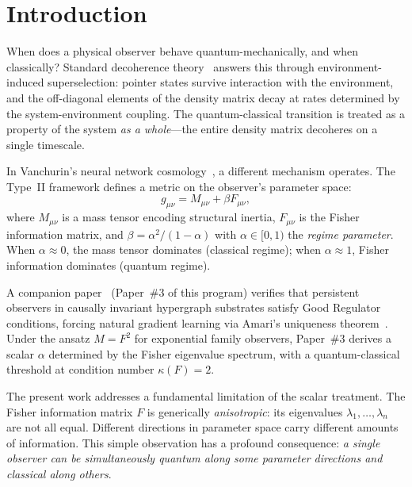 \documentclass[11pt,a4paper]{article}
\theoremstyle{plain}
\theoremstyle{definition}
\begin{document}
\section{Introduction}
\label{sec:intro}

When does a physical observer behave quantum-mechanically, and when
classically?  Standard decoherence theory~\cite{zurek2003decoherence,
joos1985emergence, schlosshauer2005decoherence} answers this through
environment-induced superselection: pointer states survive interaction
with the environment, and the off-diagonal elements of the density
matrix decay at rates determined by the system-environment coupling.
The quantum-classical transition is treated as a property of the system
\emph{as a whole}---the entire density matrix decoheres on a
single timescale.

In Vanchurin's neural network cosmology~\cite{vanchurin2020world,
vanchurin2025covariant}, a different mechanism operates.  The Type~II
framework defines a metric on the observer's parameter space:
\begin{equation}
\label{eq:type2metric}
g_{\mu\nu} = M_{\mu\nu} + \beta F_{\mu\nu},
\end{equation}
where $M_{\mu\nu}$ is a mass tensor encoding structural inertia,
$F_{\mu\nu}$ is the Fisher information matrix, and
$\beta = \alpha^2/(1-\alpha)$ with $\alpha \in [0,1)$ the
\emph{regime parameter}.  When $\alpha \approx 0$, the mass tensor
dominates (classical regime); when $\alpha \approx 1$, Fisher
information dominates (quantum regime).

A companion paper~\cite{companion_amari} (Paper~\#3 of this program)
verifies that persistent observers in causally invariant hypergraph
substrates satisfy Good Regulator conditions, forcing natural gradient
learning via Amari's uniqueness theorem~\cite{amari1998natural}.
Under the ansatz $M = F^2$ for exponential family observers,
Paper~\#3 derives a scalar $\alpha$ determined by the Fisher
eigenvalue spectrum, with a quantum-classical threshold at
condition number $\kappa(F) = 2$.

The present work addresses a fundamental limitation of the scalar
treatment.  The Fisher information matrix $F$ is generically
\emph{anisotropic}: its eigenvalues $\lambda_1, \ldots, \lambda_n$
are not all equal.  Different directions in parameter space carry
different amounts of information.  This simple observation has a
profound consequence: \emph{a single observer can be simultaneously
quantum along some parameter directions and classical along others}.
\end{document}
